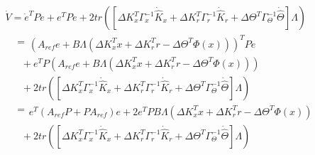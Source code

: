 \begin{equation}
\begin{array}{l}
  \dot V = {{\dot e}^T}Pe + {e^T}P\dot e + 2tr\left( {\left[ {\Delta K_x^T\Gamma _x^{ - 1}{\dot{\hat{K}}}_x + \Delta K_r^T\Gamma _r^{ - 1}{\dot{\hat{K}}}_r + \Delta {\Theta ^T}\Gamma _\Theta ^{ - 1}\dot{\hat{\Theta}} } \right]\Lambda } \right) \\
 \begin{array}{*{20}{c}}
   {} &  =   \\
\end{array}{\left( {{A_{ref}}e + B\Lambda \left( {\Delta K_x^Tx + \Delta K_r^Tr - \Delta {\Theta ^T}\Phi \left( x \right)} \right)} \right)^T}Pe \\
 \begin{array}{*{20}{c}}
   {} & {}  \\
\end{array} + {e^T}P\left( {{A_{ref}}e + B\Lambda \left( {\Delta K_x^Tx + \Delta K_r^Tr - \Delta {\Theta ^T}\Phi \left( x \right)} \right)} \right) \\
 \begin{array}{*{20}{c}}
   {} & {}  \\
\end{array} + 2tr\left( {\left[ {\Delta K_x^T\Gamma _x^{ - 1}{{\dot {\hat {K}}}_x} + \Delta K_r^T\Gamma _r^{ - 1}{{\dot {\hat {K}}}_r} + \Delta {\Theta ^T}\Gamma _\Theta ^{ - 1}\dot {\hat{ \Theta}} } \right]\Lambda } \right) \\
 \begin{array}{*{20}{c}}
   {} &  =   \\
\end{array}{e^T}\left( {{A_{ref}}P + P{A_{ref}}} \right)e + 2{e^T}PB\Lambda \left( {\Delta K_x^Tx + \Delta K_r^Tr - \Delta {\Theta ^T}\Phi \left( x \right)} \right) \\
 \begin{array}{*{20}{c}}
   {} & {}  \\
\end{array} + 2tr\left( {\left[ {\Delta K_x^T\Gamma _x^{ - 1}{{\dot {\hat K}}_x} + \Delta K_r^T\Gamma _r^{ - 1}{{\dot {\hat K}}_r} + \Delta {\Theta ^T}\Gamma _\Theta ^{ - 1}\dot {\hat \Theta} } \right]\Lambda } \right) \\
 \end{array}
\end{equation}

